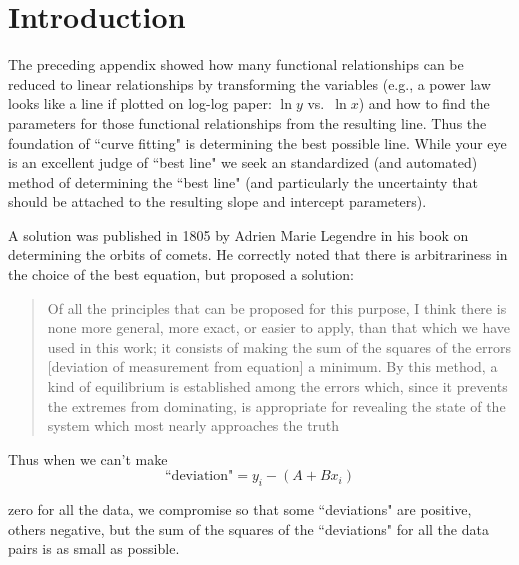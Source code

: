 \newapp
\label{compassis}

\section*{Introduction}

The preceding appendix showed how many functional relationships
can be reduced to linear relationships by transforming the
variables (e.g., a power law looks like a line if plotted on
log-log paper: $\ln y$ vs.\ $\ln x$) and how to find the parameters
for those functional relationships from the resulting line.
Thus the foundation of ``curve fitting" is determining the
best possible line.  While your eye is an excellent judge of
``best line" we seek an standardized (and automated) method of
determining the ``best line" (and particularly the uncertainty that
should be attached to the resulting slope and intercept parameters).

A solution was published in 1805 by Adrien Marie Legendre in his book 
on determining the orbits of comets. He correctly noted that there is 
arbitrariness in the choice of the best equation, but proposed a solution:

\begin{quote}
Of all the principles that can be proposed for this purpose, I think there 
is none more general, more exact, or easier to apply, than that which we have 
used in this work; it consists of making the sum of the squares of the errors 
[deviation of measurement from equation] a minimum. By this method, a kind of 
equilibrium is established among the errors which, since it prevents the extremes 
from dominating, is appropriate for revealing the state of the system which most 
nearly approaches the truth 
\end{quote}

Thus when we can't make
\begin{equation}
\mbox{``deviation"} =y_i-(A+Bx_i)\label{eq:deviation}
\end{equation}

zero for all the data, we compromise so that some ``deviations" are positive, others negative, 
but the sum of the squares of the ``deviations" for all the data pairs is as small as possible.


